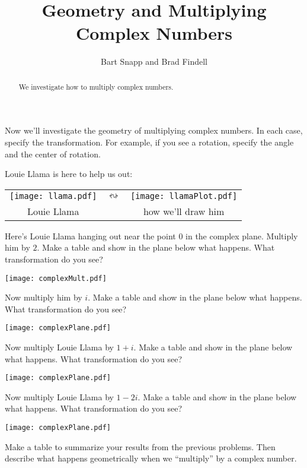 \documentclass[nooutcomes]{ximera}
\title{Geometry and Multiplying Complex Numbers}
\author{Bart Snapp and Brad Findell}
\begin{document}
\begin{abstract}
  We investigate how to multiply complex numbers.
\end{abstract}
\maketitle

\label{A:complexMultiplication}

Now we'll investigate the geometry of multiplying complex
numbers. In each case, specify the transformation.  For example, if you see a rotation, specify the angle and the center of rotation.  

Louie Llama is here to help us out:
\begin{image}
\begin{tabular}{ccc}
\texttt{[image: llama.pdf]} & 
\qquad $\leftrightsquigarrow$\qquad & 
\texttt{[image: llamaPlot.pdf]}\\
Louie Llama & & how we'll draw him
\end{tabular}
\end{image}

\begin{problem} 
Here's Louie Llama hanging out near the point $0$ in the complex
plane. Multiply him by $2$. Make a table and show in the plane below what happens.  What transformation do you see?  
\begin{image}
\texttt{[image: complexMult.pdf]}
\end{image}
\end{problem}

\begin{problem} 
Now multiply him by $i$. Make a table and show in the plane below what happens.  What transformation do you see?  
\begin{image}
\texttt{[image: complexPlane.pdf]}
\end{image}
\end{problem}

\vfill

\begin{problem} 
Now multiply Louie Llama by $1+i$. Make a table and show in the plane
below what happens.  What transformation do you see?  
\begin{image}
\texttt{[image: complexPlane.pdf]}
\end{image}
\end{problem}

\vfill


\begin{problem} 
Now multiply Louie Llama by $1 - 2i$. Make a
table and show in the plane below what happens.  What transformation do you see?  
\begin{image}
\texttt{[image: complexPlane.pdf]}
\end{image}
\end{problem}


\begin{problem}
Make a table to summarize your results from the previous problems.  
Then describe what happens geometrically when we ``multiply''  by a complex
number. 
\end{problem}
\end{document}
